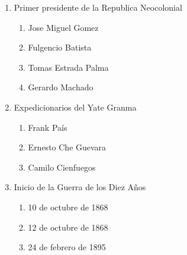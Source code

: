 \documentclass[twocolumn]{article}
\begin{document}
\begin{enumerate}



  \item Primer presidente de la Republica Neocolonial

  \begin{enumerate}
   
   \item Jose Miguel Gomez
   
   \item Fulgencio Batista
   
   \item Tomas Estrada Palma
   
   \item Gerardo Machado
   
  \end{enumerate}



  \item Expedicionarios del Yate Granma

  \begin{enumerate}
   
   \item Frank País
   
   \item Ernesto Che Guevara
   
   \item Camilo Cienfuegos
   
  \end{enumerate}



  \item Inicio de la Guerra de los Diez Años

  \begin{enumerate}
   
   \item 10 de octubre de 1868
   
   \item 12 de octubre de 1868
   
   \item 24 de febrero de 1895
   

\end{enumerate}
\end{enumerate}
\end{document}

